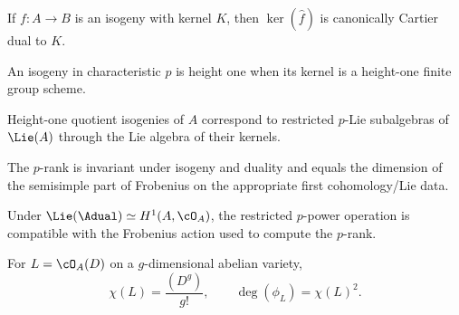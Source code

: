 \begin{theorem}
\label{mumford3-dual-isogeny-kernel}
If $f:A\to B$ is an isogeny with kernel $K$, then
$\ker(\widehat f)$ is canonically Cartier dual to $K$.
\notready
\end{theorem}

\begin{definition}
\label{mumford3-height-one-isogeny}
An isogeny in characteristic $p$ is height one when its kernel is a height-one
finite group scheme.
\notready
\end{definition}

\begin{theorem}
\label{mumford3-height-one-isogeny-p-lie}
Height-one quotient isogenies of $A$ correspond to restricted $p$-Lie
subalgebras of $\Lie(A)$ through the Lie algebra of their kernels.
\notready
\end{theorem}

\begin{theorem}
\label{mumford3-p-rank-lie-frobenius}
The $p$-rank is invariant under isogeny and duality and equals the dimension of
the semisimple part of Frobenius on the appropriate first cohomology/Lie data.
\notready
\end{theorem}

\begin{theorem}
\label{mumford3-lie-frobenius-compatibility}
Under $\Lie(\Adual)\simeq H^1(A,\cO_A)$, the restricted $p$-power operation is
compatible with the Frobenius action used to compute the $p$-rank.
\notready
\end{theorem}

\begin{theorem}
\label{mumford3-riemann-roch}
For $L=\cO_A(D)$ on a $g$-dimensional abelian variety,
\[
 \chi(L)=\frac{(D^g)}{g!},\qquad \deg(\phi_L)=\chi(L)^2.
\]
\notready
\end{theorem}

